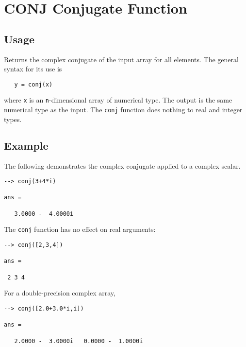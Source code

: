 \section{CONJ Conjugate Function}

\subsection{Usage}

Returns the complex conjugate of the input array for all elements.  The 
general syntax for its use is
\begin{verbatim}
   y = conj(x)
\end{verbatim}
where \verb|x| is an \verb|n|-dimensional array of numerical type.  The output 
is the same numerical type as the input.  The \verb|conj| function does
nothing to real and integer types.
\subsection{Example}

The following demonstrates the complex conjugate applied to a complex scalar.
\begin{verbatim}
--> conj(3+4*i)

ans = 

   3.0000 -  4.0000i 
\end{verbatim}
The \verb|conj| function has no effect on real arguments:
\begin{verbatim}
--> conj([2,3,4])

ans = 

 2 3 4 
\end{verbatim}
For a double-precision complex array,
\begin{verbatim}
--> conj([2.0+3.0*i,i])

ans = 

   2.0000 -  3.0000i   0.0000 -  1.0000i 
\end{verbatim}
